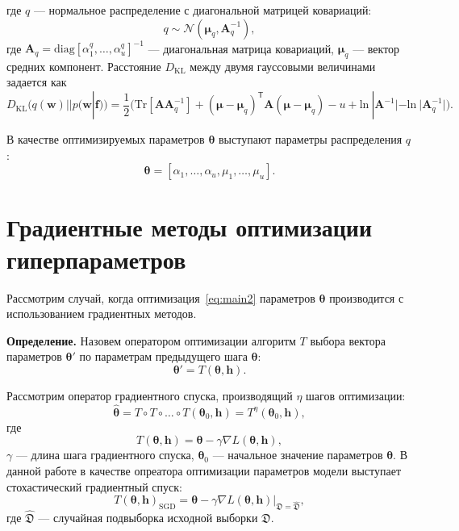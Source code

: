 \documentclass[12pt]{article}
\begin{document}
где $q$ --- нормальное распределение с диагональной матрицей ковариаций:
\begin{equation}
\label{eq:diag}
	q \sim \mathcal{N}(\boldsymbol{\mu}_q, \mathbf{A}^{-1}_q),
\end{equation}
где $\mathbf{A}_q = \text{diag}[\alpha^q_1, \dots, \alpha^q_u]^{-1}$ --- диагональная матрица ковариаций, $\boldsymbol{\mu}_q$ --- вектор средних компонент.
Расстояние $D_\text{KL}$ между двумя гауссовыми величинами задается как 
\[
	D_\text{KL}\bigl(q (\mathbf{w}) || p (\mathbf{w}|\mathbf{f})\bigr) = \frac{1}{2} \bigl( \text{Tr} [\mathbf{A}\mathbf{A}^{-1}_q] + (\boldsymbol{\mu} - \boldsymbol{\mu}_q)^\mathsf{T}\mathbf{A}(\boldsymbol{\mu} - \boldsymbol{\mu}_q) - u +\text{ln}~|\mathbf{A}^{-1}| - \text{ln}~|\mathbf{A}_q^{-1}| \bigr).
\]

В качестве оптимизируемых параметров $\boldsymbol{\theta}$ выступают параметры распределения $q$:
\[
\boldsymbol{\theta} = [\alpha_1, \dots, \alpha_u, {\mu}_1,\dots,{\mu}_u].
\]




\section{Градиентные методы оптимизации гиперпараметров}
Рассмотрим случай, когда оптимизация~\eqref{eq:main2} параметров $\boldsymbol{\theta}$ производится с использованием градиентных методов. 

\textbf{Определение.} Назовем оператором оптимизации алгоритм $T$ выбора вектора параметров $\boldsymbol{\theta}'$  по параметрам предыдущего шага $\boldsymbol{\theta}$:
\[
	\boldsymbol{\theta}' = T(\boldsymbol{\theta}, \mathbf{h}).
\]

Рассмотрим оператор градиентного спуска, производящий $\eta$ шагов оптимизации:
\begin{equation}
\label{eq:gd}
	 \hat{\boldsymbol{\theta}} = T \circ T \circ \dots \circ T(\boldsymbol{\theta}_0, \mathbf{h}) = T^\eta(\boldsymbol{\theta}_0, \mathbf{h}),
\end{equation}
где 
$$
	T(\boldsymbol{\theta}, \mathbf{h}) =\boldsymbol{\theta} - \gamma \nabla L(\boldsymbol{\theta}, \mathbf{h}), 
$$
$\gamma$ --- длина шага градиентного спуска, $\boldsymbol{\theta}_0$ --- начальное значение параметров $\boldsymbol{\theta}$. В данной работе в качестве опреатора оптимизации параметров модели выступает стохастический градиентный спуск:
\[
T(\boldsymbol{\theta}, \mathbf{h})_\text{SGD} =\boldsymbol{\theta} - \gamma \nabla L(\boldsymbol{\theta}, \mathbf{h})|_{\mathfrak{D} = \hat{\mathfrak{D}}},
\]
где $\hat{\mathfrak{D}}$ --- случайная подвыборка исходной выборки $\mathfrak{D}$.
\end{document}

